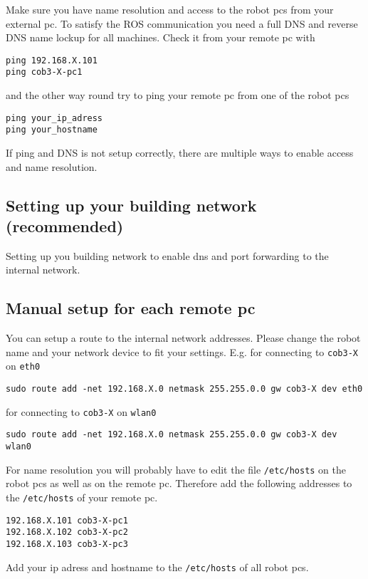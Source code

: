 Make sure you have name resolution and access to the robot pcs from your external pc. To satisfy the ROS communication you need a full DNS and reverse DNS name lockup for all machines. Check it from your remote pc with
\begin{lstlisting}
ping 192.168.X.101
ping cob3-X-pc1
\end{lstlisting}
and the other way round try to ping your remote pc from one of the robot pcs
\begin{lstlisting}
ping your_ip_adress
ping your_hostname
\end{lstlisting}

If ping and DNS is not setup correctly, there are multiple ways to enable access and name resolution.

\subsection{Setting up your building network (recommended)}
Setting up you building network to enable dns and port forwarding to the internal network.

\subsection{Manual setup for each remote pc}
You can setup a route to the internal network addresses. Please change the robot name and your network device to fit your settings. E.g. for connecting to \texttt{cob3-X} on \texttt{eth0}
\begin{lstlisting}
sudo route add -net 192.168.X.0 netmask 255.255.0.0 gw cob3-X dev eth0
\end{lstlisting}

for connecting to \texttt{cob3-X} on \texttt{wlan0}
\begin{lstlisting}
sudo route add -net 192.168.X.0 netmask 255.255.0.0 gw cob3-X dev wlan0
\end{lstlisting}


For name resolution you will probably have to edit the file \texttt{/etc/hosts} on the robot pcs as well as on the remote pc. Therefore add the following addresses to the \texttt{/etc/hosts} of your remote pc.
\begin{lstlisting}
192.168.X.101 cob3-X-pc1
192.168.X.102 cob3-X-pc2
192.168.X.103 cob3-X-pc3
\end{lstlisting}

Add your ip adress and hostname to the \texttt{/etc/hosts} of all robot pcs.

